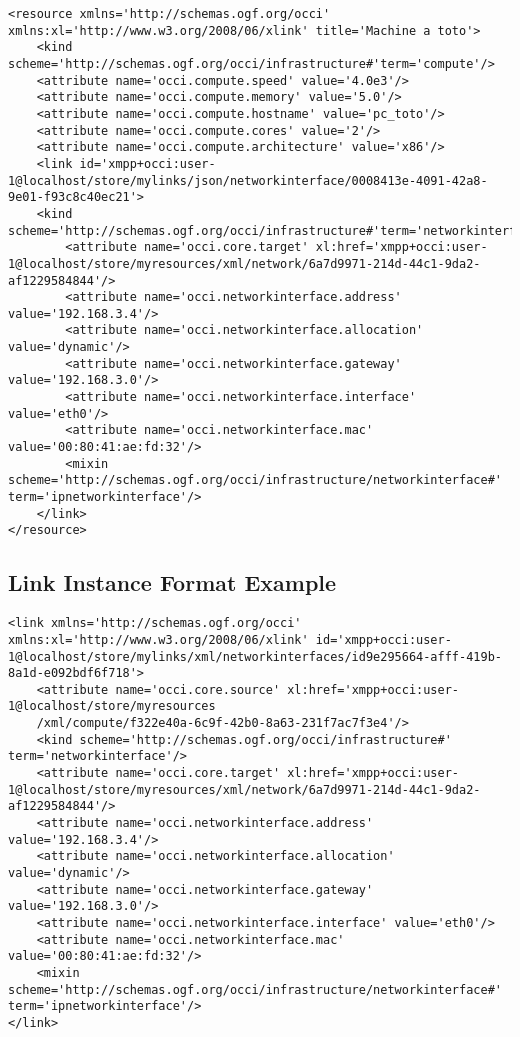 \documentclass[10pt,a4paper]{article}
\begin{document}
\begin{lstlisting}
<resource xmlns='http://schemas.ogf.org/occi' xmlns:xl='http://www.w3.org/2008/06/xlink' title='Machine a toto'>
	<kind scheme='http://schemas.ogf.org/occi/infrastructure#'term='compute'/>
	<attribute name='occi.compute.speed' value='4.0e3'/>
	<attribute name='occi.compute.memory' value='5.0'/>
	<attribute name='occi.compute.hostname' value='pc_toto'/>
	<attribute name='occi.compute.cores' value='2'/>
	<attribute name='occi.compute.architecture' value='x86'/>
	<link id='xmpp+occi:user-1@localhost/store/mylinks/json/networkinterface/0008413e-4091-42a8-9e01-f93c8c40ec21'>
	<kind scheme='http://schemas.ogf.org/occi/infrastructure#'term='networkinterface'/>
		<attribute name='occi.core.target' xl:href='xmpp+occi:user-1@localhost/store/myresources/xml/network/6a7d9971-214d-44c1-9da2-af1229584844'/>
		<attribute name='occi.networkinterface.address' value='192.168.3.4'/>
		<attribute name='occi.networkinterface.allocation' value='dynamic'/>
		<attribute name='occi.networkinterface.gateway' value='192.168.3.0'/>
		<attribute name='occi.networkinterface.interface' value='eth0'/>
		<attribute name='occi.networkinterface.mac' value='00:80:41:ae:fd:32'/>
		<mixin scheme='http://schemas.ogf.org/occi/infrastructure/networkinterface#' term='ipnetworkinterface'/>
	</link>
</resource>
\end{lstlisting}

\subsection{Link Instance Format Example}
\label{sec:example_link}

\begin{lstlisting}
<link xmlns='http://schemas.ogf.org/occi' xmlns:xl='http://www.w3.org/2008/06/xlink' id='xmpp+occi:user-1@localhost/store/mylinks/xml/networkinterfaces/id9e295664-afff-419b-8a1d-e092bdf6f718'>
	<attribute name='occi.core.source' xl:href='xmpp+occi:user-1@localhost/store/myresources
	/xml/compute/f322e40a-6c9f-42b0-8a63-231f7ac7f3e4'/>
	<kind scheme='http://schemas.ogf.org/occi/infrastructure#' term='networkinterface'/>
	<attribute name='occi.core.target' xl:href='xmpp+occi:user-1@localhost/store/myresources/xml/network/6a7d9971-214d-44c1-9da2-af1229584844'/>
	<attribute name='occi.networkinterface.address' value='192.168.3.4'/>
	<attribute name='occi.networkinterface.allocation' value='dynamic'/>
	<attribute name='occi.networkinterface.gateway' value='192.168.3.0'/>
	<attribute name='occi.networkinterface.interface' value='eth0'/>
	<attribute name='occi.networkinterface.mac' value='00:80:41:ae:fd:32'/>
	<mixin scheme='http://schemas.ogf.org/occi/infrastructure/networkinterface#' term='ipnetworkinterface'/>
</link>
\end{lstlisting}
\end{document}
